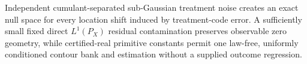 Independent cumulant-separated sub-Gaussian treatment noise creates an exact null space for every location shift induced by treatment-code error.  A sufficiently small fixed direct \(L^1(P_X)\) residual contamination preserves observable zero geometry, while certified-real primitive constants permit one law-free, uniformly conditioned contour bank and estimation without a supplied outcome regression.